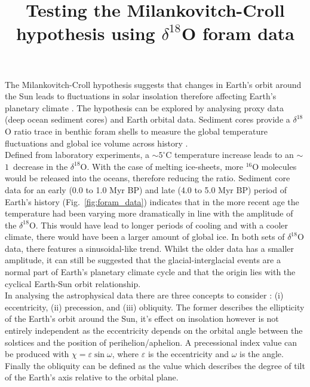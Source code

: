 \documentclass[12pt, onecolumn]{revtex4}    %
\begin{document}
                     

\title{Testing the Milankovitch-Croll hypothesis using $\delta^{18}$O foram data} 
\maketitle

\vspace{-4ex}

The Milankovitch-Croll hypothesis suggests that changes in Earth's orbit around the Sun leads to fluctuations in solar insolation therefore affecting Earth's planetary climate \cite{ruddiman_climate}. The hypothesis can be explored by analysing proxy data (deep ocean sediment cores) and Earth orbital data. Sediment cores provide a $\delta^{18}$O ratio trace in benthic foram shells to measure the global temperature fluctuations and global ice volume across history \cite{droxler_climate}. \\


Defined from laboratory experiments, a $\sim$$5^{\circ}\mathrm{C}$ temperature increase leads to an $\sim$$1$\textperthousand\ decrease in the $\delta^{18}$O. With the case of melting ice-sheets, more $^{16}$O molecules would be released into the oceans, therefore reducing the ratio. Sediment core data for an early (0.0 to 1.0 Myr BP) and late (4.0 to 5.0 Myr BP) period of Earth's history (Fig.~\ref{fig:foram_data}) indicates that in the more recent age the temperature had been varying more dramatically in line with the amplitude of the $\delta^{18}$O. This would have lead to longer periods of cooling and with a cooler climate, there would have been a larger amount of global ice. In both sets of $\delta^{18}$O data, there features a sinusoidal-like trend. Whilst the older data has a smaller amplitude, it can still be suggested that the glacial-interglacial events are a normal part of Earth's planetary climate cycle and that the origin lies with the cyclical Earth-Sun orbit relationship. \\

In analysing the astrophysical data there are three concepts to consider \cite{ruddiman_climate}: (i) eccentricity, (ii) precession, and (iii) obliquity. The former describes the ellipticity of the Earth's orbit around the Sun, it's effect on insolation however is not entirely independent as the eccentricity depends on the orbital angle between the solstices and the position of perihelion/aphelion. A precessional index value can be produced with $\chi= \varepsilon \sin{\omega}$, where $\varepsilon$ is the eccentricity and $\omega$ is the angle. Finally the obliquity can be defined as the value which describes the degree of tilt of the Earth's axis relative to the orbital plane.  \\
\end{document}
